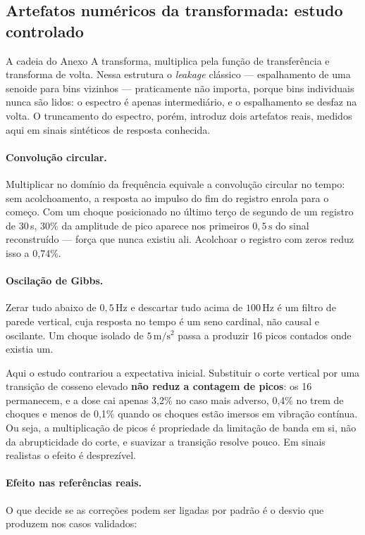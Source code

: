 \documentclass[11pt,a4paper]{article}
\newcommand{\unit}[2]{\ensuremath{#1\,\mathrm{#2}}}
\begin{document}
\subsection{Artefatos numéricos da transformada: estudo controlado}
\label{sec:leakage}

A cadeia do Anexo A transforma, multiplica pela função de transferência e
transforma de volta. Nessa estrutura o \emph{leakage} clássico --- espalhamento
de uma senoide para bins vizinhos --- praticamente não importa, porque bins
individuais nunca são lidos: o espectro é apenas intermediário, e o
espalhamento se desfaz na volta. O truncamento do espectro, porém, introduz dois
artefatos reais, medidos aqui em sinais sintéticos de resposta conhecida.

\paragraph{Convolução circular.} Multiplicar no domínio da frequência equivale a
convolução circular no tempo: sem acolchoamento, a resposta ao impulso do fim do
registro enrola para o começo. Com um choque posicionado no último terço de
segundo de um registro de 30\,s, 30\% da amplitude de pico aparece nos primeiros
\unit{0{,}5}{s} do sinal reconstruído --- força que nunca existiu ali. Acolchoar
o registro com zeros reduz isso a 0,74\%.

\paragraph{Oscilação de Gibbs.} Zerar tudo abaixo de \unit{0{,}5}{Hz} e
descartar tudo acima de \unit{100}{Hz} é um filtro de parede vertical, cuja
resposta no tempo é um seno cardinal, não causal e oscilante. Um choque isolado
de \unit{5}{m/s^2} passa a produzir 16 picos contados onde existia um.

Aqui o estudo contrariou a expectativa inicial. Substituir o corte vertical por
uma transição de cosseno elevado \textbf{não reduz a contagem de picos}: os 16
permanecem, e a dose cai apenas 3,2\% no caso mais adverso, 0,4\% no trem de
choques e menos de 0,1\% quando os choques estão imersos em vibração contínua.
Ou seja, a multiplicação de picos é propriedade da limitação de banda em si, não
da abrupticidade do corte, e suavizar a transição resolve pouco. Em sinais
realistas o efeito é desprezível.

\paragraph{Efeito nas referências reais.} O que decide se as correções podem ser
ligadas por padrão é o desvio que produzem nos casos validados:
\end{document}
